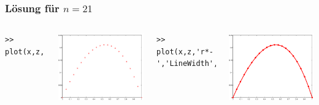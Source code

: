 %
%
\begin{frame}[fragile]\frametitle{Lösung für $n=21$}
\begin{columns}[c]
\begin{lstlisting}[basicstyle=\tiny]
>> plot(x,z,'r*','MarkerSize',8)
\end{lstlisting}
\includegraphics[width=\textwidth]{./figures/bild1_27_10}

\begin{lstlisting}[basicstyle=\tiny]
>> plot(x,z,'r*-','LineWidth',3,'MarkerSize',8)
\end{lstlisting}%
\includegraphics[width=\textwidth]{./figures/bild2_27_10}
\end{columns}
\end{frame}


